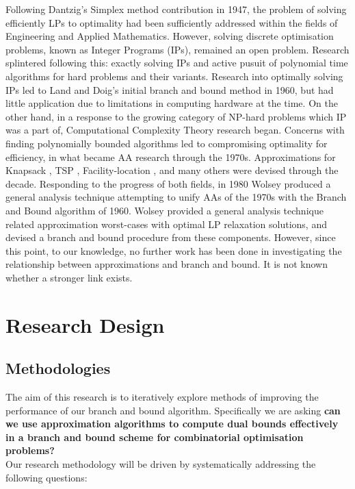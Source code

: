 \documentclass[12pt, a4paper]{article}
\begin{document}
Following Dantzig's \cite{Dantzig} Simplex method contribution in 1947, the problem of solving efficiently LPs to optimality had been sufficiently addressed within the fields of Engineering and Applied Mathematics. However, solving discrete optimisation problems, known as Integer Programs (IPs), remained an open problem. Research splintered following this: exactly solving IPs and active pusuit of polynomial time algorithms for hard problems and their variants. Research into optimally solving IPs led to Land and Doig's initial branch and bound method \cite{LandDoig} in 1960, but had little application due to limitations in computing hardware at the time. On the other hand, in a response to the growing category of NP-hard problems which IP was a part of, Computational Complexity Theory research began. Concerns with finding polynomially bounded algorithms led to compromising optimality for efficiency, in what became AA research through the 1970s. Approximations for Knapsack \cite{IbarraKim}, TSP \cite{CristofidesTSP}, Facility-location \cite{CornuejolsFisherNemhauser}, and many others were devised through the decade. Responding to the progress of both fields, in 1980 Wolsey \cite{WOLSEY} produced a general analysis technique attempting to unify AAs of the 1970s with the Branch and Bound algorithm of 1960. Wolsey provided a general analysis technique related approximation worst-cases with optimal LP relaxation solutions, and devised a branch and bound procedure from these components. However, since this point, to our knowledge, no further work has been done in investigating the relationship between approximations and branch and bound. It is not known whether a stronger link exists.

\section{Research Design}

\subsection{Methodologies}

The aim of this research is to iteratively explore methods of improving the performance of our branch and bound algorithm. Specifically we are asking \textbf{can we use approximation algorithms to compute dual bounds effectively in a branch and bound scheme for combinatorial optimisation problems?}\\

Our research methodology will be driven by systematically addressing the following questions:
\end{document}
